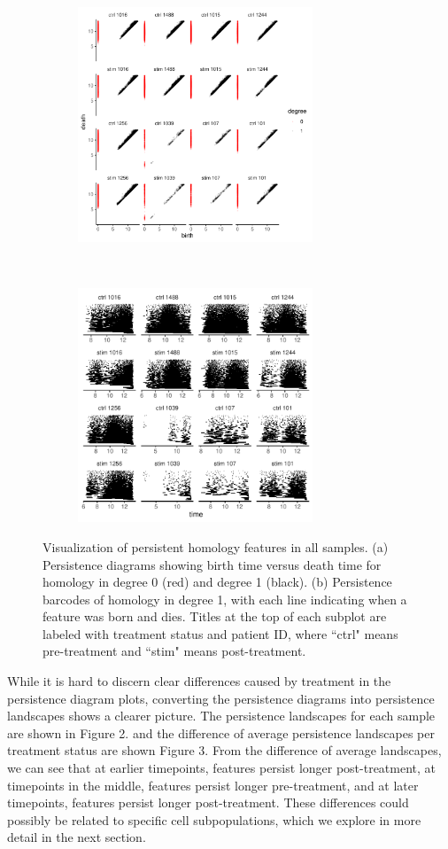 \documentclass[11pt]{article}
\begin{document}
\begin{figure}[!htb]
    \centering
    \begin{subfigure}[t]{0.5\textwidth}
        \centering
	\includegraphics[width=7cm]{results/all_persistence_diagrams.pdf}
        \caption{}
    \end{subfigure}%
    ~ 
    \begin{subfigure}[t]{0.5\textwidth}
        \centering
	\includegraphics[width=7cm]{results/all_barcodes.pdf}
        \caption{}
    \end{subfigure}
    \caption{Visualization of persistent homology features in all samples. (a) Persistence diagrams showing birth time versus death time for homology in degree 0 (red) and degree 1 (black). (b) Persistence barcodes of homology in degree 1, with each line indicating when a feature was born and dies. Titles at the top of each subplot are labeled with treatment status and patient ID, where ``ctrl" means pre-treatment and ``stim" means post-treatment.}
\end{figure}

While it is hard to discern clear differences caused by treatment in the persistence diagram plots, converting the persistence diagrams into persistence landscapes shows a clearer picture. The persistence landscapes for each sample are shown in Figure 2. and the difference of average persistence landscapes per treatment status are shown Figure 3. From the difference of average landscapes, we can see that at earlier timepoints, features persist longer post-treatment, at timepoints in the middle, features persist longer pre-treatment, and at later timepoints, features persist longer post-treatment. These differences could possibly be related to specific cell subpopulations, which we explore in more detail in the next section.
\end{document}
